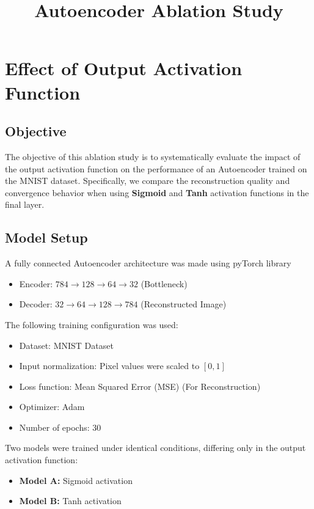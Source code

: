 \documentclass[12pt]{article}
\begin{document}
\title{Autoencoder Ablation Study}
\maketitle

\section{Effect of Output Activation Function}

\subsection{Objective}
The objective of this ablation study is to systematically evaluate the impact of the output activation function on the performance of an Autoencoder trained on the MNIST dataset. Specifically, we compare the reconstruction quality and convergence behavior when using \textbf{Sigmoid} and \textbf{Tanh} activation functions in the final layer.

\subsection{Model Setup}

A fully connected Autoencoder architecture was made using pyTorch library
\begin{itemize}
    \item Encoder: $784 \rightarrow 128 \rightarrow 64 \rightarrow 32$ (Bottleneck)
    \item Decoder: $32 \rightarrow 64 \rightarrow 128 \rightarrow 784$ (Reconstructed Image)
\end{itemize}

The following training configuration was used:
\begin{itemize}
    \item Dataset: MNIST Dataset
    \item Input normalization: Pixel values were scaled to $[0,1]$
    \item Loss function: Mean Squared Error (MSE) (For Reconstruction)
    \item Optimizer: Adam
    \item Number of epochs: 30
\end{itemize}

Two models were trained under identical conditions, differing only in the output activation function:
\begin{itemize}
    \item \textbf{Model A:} Sigmoid activation
    \item \textbf{Model B:} Tanh activation
\end{itemize}
\end{document}
